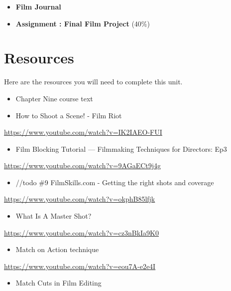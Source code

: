 \documentclass[
]{book}
\providecommand{\tightlist}{%
  \setlength{\itemsep}{0pt}\setlength{\parskip}{0pt}}
\begin{document}
\begin{itemize}
\tightlist
\item
  \textbf{Film Journal}\\
\item
  \textbf{Assignment : Final Film Project} (40\%)
\end{itemize}

\hypertarget{resources-8}{%
\section*{Resources}\label{resources-8}}

Here are the resources you will need to complete this unit.

\begin{itemize}
\tightlist
\item
  Chapter Nine course text
\item
  How to Shoot a Scene! - Film Riot
\end{itemize}

\url{https://www.youtube.com/watch?v=IK2IAEO-FUI}

\begin{itemize}
\tightlist
\item
  Film Blocking Tutorial --- Filmmaking Techniques for Directors: Ep3
\end{itemize}

\url{https://www.youtube.com/watch?v=9AGaECt9j4g}

\begin{itemize}
\tightlist
\item
  //todo \#9 FilmSkills.com - Getting the right shots and coverage
\end{itemize}

\url{https://www.youtube.com/watch?v=okphB85lfjk}

\begin{itemize}
\tightlist
\item
  What Is A Master Shot?
\end{itemize}

\url{https://www.youtube.com/watch?v=cz3nBkIa9K0}

\begin{itemize}
\tightlist
\item
  Match on Action technique
\end{itemize}

\url{https://www.youtube.com/watch?v=eou7A-e2e4I}

\begin{itemize}
\tightlist
\item
  Match Cuts in Film Editing
\end{itemize}
\end{document}
